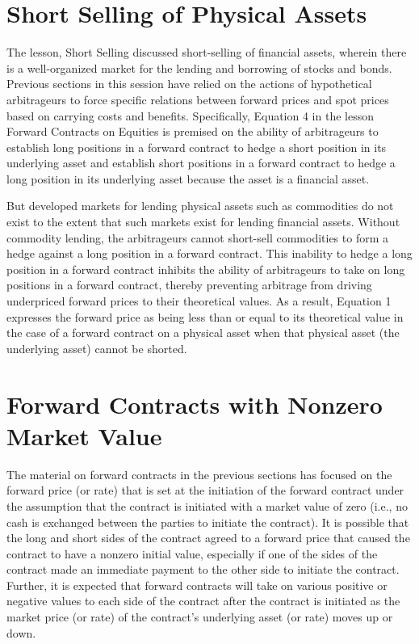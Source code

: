 \documentclass[11pt]{article}
\begin{document}
\section*{Short Selling of Physical Assets}
The lesson, Short Selling discussed short-selling of financial assets, wherein there is a well-organized market for the lending and borrowing of stocks and bonds. Previous sections in this session have relied on the actions of hypothetical arbitrageurs to force specific relations between forward prices and spot prices based on carrying costs and benefits. Specifically, Equation 4 in the lesson Forward Contracts on Equities is premised on the ability of arbitrageurs to establish long positions in a forward contract to hedge a short position in its underlying asset and establish short positions in a forward contract to hedge a long position in its underlying asset because the asset is a financial asset.

But developed markets for lending physical assets such as commodities do not exist to the extent that such markets exist for lending financial assets. Without commodity lending, the arbitrageurs cannot short-sell commodities to form a hedge against a long position in a forward contract. This inability to hedge a long position in a forward contract inhibits the ability of arbitrageurs to take on long positions in a forward contract, thereby preventing arbitrage from driving underpriced forward prices to their theoretical values. As a result, Equation 1 expresses the forward price as being less than or equal to its theoretical value in the case of a forward contract on a physical asset when that physical asset (the underlying asset) cannot be shorted.

\section*{Forward Contracts with Nonzero Market Value}
The material on forward contracts in the previous sections has focused on the forward price (or rate) that is set at the initiation of the forward contract under the assumption that the contract is initiated with a market value of zero (i.e., no cash is exchanged between the parties to initiate the contract). It is possible that the long and short sides of the contract agreed to a forward price that caused the contract to have a nonzero initial value, especially if one of the sides of the contract made an immediate payment to the other side to initiate the contract. Further, it is expected that forward contracts will take on various positive or negative values to each side of the contract after the contract is initiated as the market price (or rate) of the contract's underlying asset (or rate) moves up or down.
\end{document}

